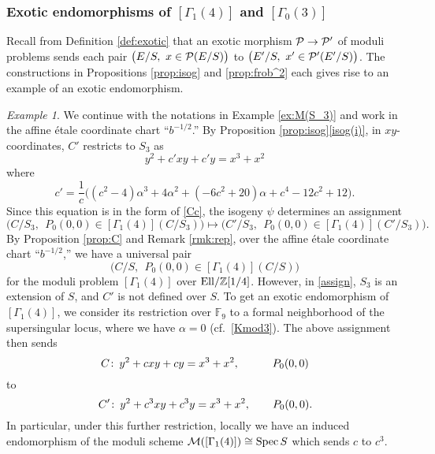 \documentclass{gtpart}
\theoremstyle{definition}
\theoremstyle{remark}
\newtheorem{ex}[thm]{Example}
\def\co{\colon\thinspace}
\newcommand{\mb}[1]{\mathbb{#1}}
\newcommand{\Spec}{{\rm Spec\thinspace}}
\newcommand{\Ell}{{\rm Ell}}
\newcommand{\CM}{{\cal M}}
\newcommand{\CP}{{\cal P}}
\newcommand{\BF}{{\mb F}}
\newcommand{\BZ}{{\mb Z}}
\newcommand{\A}{\alpha}
\newcommand{\G}{\Gamma}
\newcommand{\isog}[1]{Proposition \ref{prop:isog}\thinspace \eqref{isog(#1)}}
\numberwithin{equation}{section}
\numberwithin{thm}{section}
\begin{document}
\subsubsection*{Exotic endomorphisms of $[\G_1(4)]$ and $[\G_0(3)]$}

Recall from Definition \ref{def:exotic} that an exotic morphism 
$\CP \to \CP'$ of moduli problems sends each pair 
$\big( E/S, ~ x \in \CP(E/S) \big)$ to 
$\big( E'/S, ~ x' \in \CP'(E'/S) \big)$.  The constructions in 
Propositions \ref{prop:isog} and \ref{prop:frob^2} each gives rise to an 
example of an exotic endomorphism.  

\begin{ex}
\label{ex:ab4}
 We continue with the notations in Example \ref{ex:M(S_3)} and work in 
 the affine \'etale coordinate chart ``$b^{-1/2}$.''  By \isog{i}, in 
 $xy$-coordinates, $C'$ restricts to $S_3$ as 
 \[
  y^2 + c' x y + c' y = x^3 + x^2 
 \]
 where 
 \[
  c' = \frac{1}{c} \big( (c^2 - 4) \A^3 + 4 \A^2 + (-6 c^2 + 20) \A 
  + c^4 - 12 c^2 + 12 \big).  
 \]
 Since this equation is in the form of \eqref{Cc}, the isogeny $\psi$ 
 determines an assignment 
 \begin{equation}
 \label{assign}
  \big( C/S_3, ~~ P_0(0,0) \in [\G_1(4)](C/S_3) \big) \longmapsto 
  \big( C'/S_3, ~~ P_0(0,0) \in [\G_1(4)](C'/S_3) \big).  
 \end{equation}
 By Proposition \ref{prop:C} and Remark \ref{rmk:rep}, over the affine 
 \'etale coordinate chart ``$b^{-1/2}$,'' we have a universal pair 
 \[
  \big( C/S, ~~ P_0(0,0) \in [\G_1(4)](C/S) \big) 
 \]
 for the moduli problem $[\G_1(4)]$ over $\Ell/\BZ[1/4]$.  However, in 
 \eqref{assign}, $S_3$ is an extension of $S$, and $C'$ is not defined 
 over $S$.  To get an exotic endomorphism of $[\G_1(4)]$, we consider 
 its restriction over $\BF_9$ to a formal neighborhood of the 
 supersingular locus, where we have $\A = 0$ (cf.~\eqref{Kmod3}).  The 
 above assignment then sends 
 \[
  C \co y^2 + c x y + c y = x^3 + x^2, \qquad ~~~ P_0(0,0) 
 \]
 to 
 \[
  \thinspace C' \co y^2 + c^3 x y + c^3 y = x^3 + x^2, \qquad P_0(0,0).  
 \]
 In particular, under this further restriction, locally we have an 
 induced endomorphism of the moduli scheme 
 $\CM([\G_1(4)]) \cong \Spec S$ which sends $c$ to $c^3$.  
\end{ex}
\end{document}
